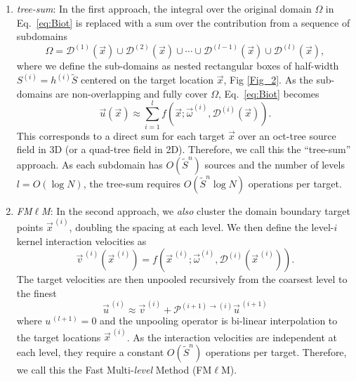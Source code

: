 \documentclass[11pt]{article}
\begin{document}
\begin{enumerate}
    \item \textit{tree-sum}: In the first approach, the integral over the original domain $\Omega$ in Eq.~\ref{eq:Biot} is replaced with a sum over the contribution from a sequence of subdomains
    \begin{equation}\label{eq:multilevel}
        \Omega = \mathcal{D}^{(1)}(\vec x) \cup \mathcal{D}^{(2)}(\vec x) \cup \cdots \cup \mathcal{D}^{(l-1)}(\vec x) \cup \mathcal{D}^{(l)}(\vec x),
    \end{equation}
    where we define the sub-domains as nested rectangular boxes of half-width $S^{(i)}=h^{(i)}\tilde S$ centered on the target location $\vec x$, Fig \ref{Fig_2}. As the sub-domains are non-overlapping and fully cover $\Omega$, 
    Eq.~\ref{eq:Biot} becomes 
    \begin{equation}\label{eq:biot_sum}
        \vec u(\vec{x}) \approx \sum_{i=1}^{l} f(\vec{x}; \vec \omega^{(i)},\mathcal{D}^{(i)}(\vec x)).
    \end{equation}
    This corresponds to a direct sum for each target $\vec x$ over an oct-tree source field in 3D (or a quad-tree field in 2D). Therefore, we call this the ``tree-sum'' approach. As each subdomain has $O(\tilde S^n)$ sources and the number of levels $l=O(\log N)$, the tree-sum requires $O(\tilde S^n\log N)$ operations per target.
    \item \textit{FM$\ell$M}: In the second approach, we \textit{also} cluster the domain boundary target points $\vec  x^{\,(i)}$, doubling the spacing at each level. We then define the level-$i$ kernel interaction velocities as
    \begin{equation}\label{eq:interaction}
        \vec v^{\,(i)}(\vec x^{\,(i)}) = f(\vec x^{\,(i)}; \vec \omega^{(i)},\mathcal{D}^{(i)}(\vec x^{\,(i)})).
    \end{equation}
    The target velocities are then unpooled recursively from the coarsest level to the finest
    \begin{equation}\label{eq:unpool}
        \vec u^{\,(i)} \approx \vec v^{\,(i)}+\mathcal{P}^{(i+1)\to(i)} \vec u^{\,(i+1)}
    \end{equation}
    where $u^{\,(l+1)}=0$ and the unpooling operator is bi-linear interpolation to the target locations $\vec x^{\,(i)}$. As the interaction velocities are independent at each level, they require a constant $O(\tilde S^n)$ operations per target. Therefore, we call this the Fast Multi-\textit{level} Method (FM$\ell$M). 
\end{enumerate}
\end{document}
